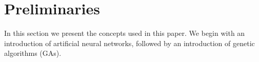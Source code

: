 \section{Preliminaries}
\label{sec:preliminaries}

In this section we present the concepts used in this paper.
We begin with an introduction of artificial neural networks, followed by an introduction of genetic algorithms (GAs). 








